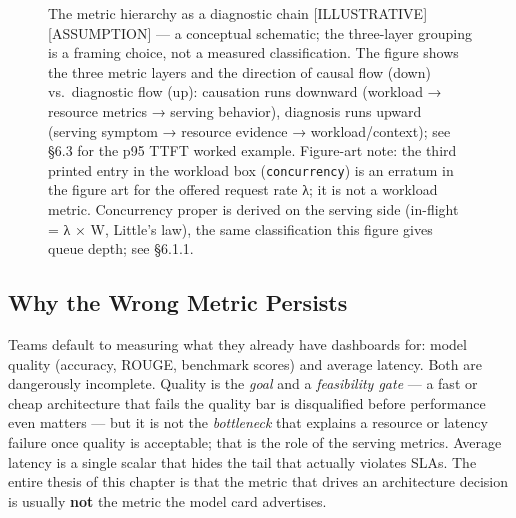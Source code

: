 \begin{figure}
\centering
{}
\caption[The metric hierarchy as a diagnostic chain \mbox{{[}ILLUSTRATIVE{]}}\hspace{0pt}\mbox{{[}ASSUMPTION{]}}]{The metric hierarchy as a diagnostic chain \mbox{{[}ILLUSTRATIVE{]}}\hspace{0pt}\mbox{{[}ASSUMPTION{]}} --- a conceptual schematic; the three-layer grouping is a framing choice, not a measured classification. The figure shows the three metric layers and the direction of causal flow (down) vs.~diagnostic flow (up): causation runs downward (workload → resource metrics → serving behavior), diagnosis runs upward (serving symptom → resource evidence → workload/context); see §6.3 for the p95 TTFT worked example. Figure-art note: the third printed entry in the workload box (\texttt{concurrency}) is an erratum in the figure art for the offered request rate λ; it is not a workload metric. Concurrency proper is derived on the serving side (in-flight = λ × W, Little's law), the same classification this figure gives queue depth; see §6.1.1.}

\label{fig:6.1}\end{figure}

\subsection{Why the Wrong Metric
Persists}\label{why-the-wrong-metric-persists}

Teams default to measuring what they already have dashboards for: model
quality (accuracy, ROUGE, benchmark scores) and average latency. Both
are dangerously incomplete. Quality is the \emph{goal} and a
\emph{feasibility gate} --- a fast or cheap architecture that fails the
quality bar is disqualified before performance even matters --- but it
is not the \emph{bottleneck} that explains a resource or latency failure
once quality is acceptable; that is the role of the serving metrics.
Average latency is a single scalar that hides the tail that actually
violates SLAs. The entire thesis of this chapter is that the metric that
drives an architecture decision is usually \textbf{not} the metric the
model card advertises.


